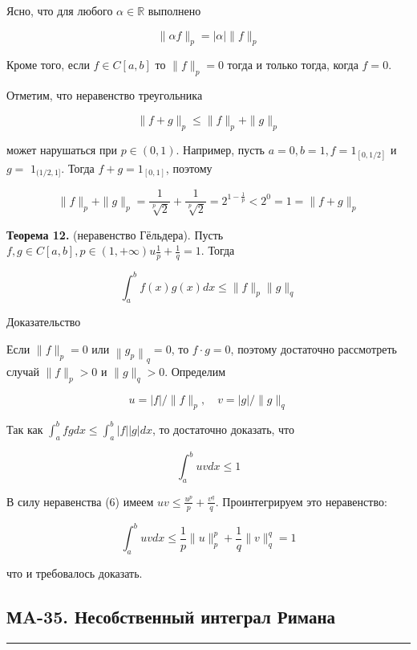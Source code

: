 \documentclass[a4paper,12pt]{article} %
\newcommand{\HRule}{\rule{\linewidth}{0.5mm}}
\begin{document}
	Ясно, что для любого $\alpha \in \mathbb{R}$ выполнено
	
	$$
	\|\alpha f\|_{p}=|\alpha|\|f\|_{p}
	$$
	
	Кроме того, если $f \in C[a, b]$ то $\|f\|_{p}=0$ тогда и только тогда, когда $f=0$.
	
	Отметим, что неравенство треугольника
	
	$$
	\|f+g\|_{p} \leq\|f\|_{p}+\|g\|_{p}
	$$
	
	может нарушаться при $p \in(0,1)$. Например, пусть $a=0, b=1, f=1_{[0,1 / 2]}$ и $g=$ $1_{(1 / 2,1]}$. Тогда $f+g=1_{[0,1]}$, поэтому
	
	$$
	\|f\|_{p}+\|g\|_{p}=\frac{1}{\sqrt[p]{2}}+\frac{1}{\sqrt[p]{2}}=2^{1-\frac{1}{p}}<2^{0}=1=\|f+g\|_{p}
	$$
	
	\textbf{Теорема 12.} (неравенство Гёльдера). Пусть $f, g \in C[a, b], p \in(1,+\infty) u \frac{1}{p}+\frac{1}{q}=1$. Тогда
	
	$$
	\int_{a}^{b} f(x) g(x) d x \leq\|f\|_{p}\|g\|_{q}
	$$
	
	Доказательство
	
	Если $\|f\|_{p}=0$ или $\left\|g_{p}\right\|_{q}=0$, то $f \cdot g=0$, поэтому достаточно рассмотреть случай $\|f\|_{p}>0$ и $\|g\|_{q}>0$. Определим
	
	$$
	u=|f| /\|f\|_{p}, \quad v=|g| /\|g\|_{q}
	$$
	
	Так как $\int_{a}^{b} f g d x \leq \int_{a}^{b}|f||g| d x$, то достаточно доказать, что
	
	$$
	\int_{a}^{b} u v d x \leq 1
	$$
	
	В силу неравенства (6) имеем $u v \leq \frac{u^{p}}{p}+\frac{v^{q}}{q}$. Проинтегрируем это неравенство:
	
	$$
	\int_{a}^{b} u v d x \leq \frac{1}{p}\|u\|_{p}^{p}+\frac{1}{q}\|v\|_{q}^{q}=1
	$$
	
	что и требовалось доказать.
	



	\newpage

	\newpage

	\begin{LARGE}
		\begin{center}
			\section{МA-35. Несобственный интеграл Римана}
		\end{center}
	\end{LARGE}
	\HRule \\
\end{document}
